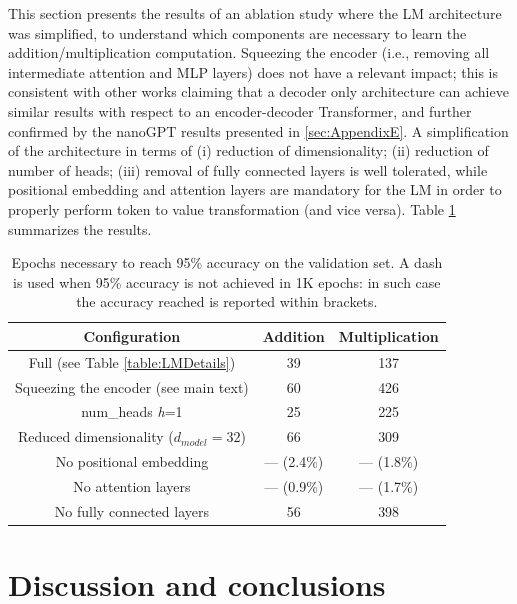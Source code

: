 \documentclass[final,1p,times,authoryear]{elsarticle}
\begin{document}
This section presents the results of an ablation study where the LM architecture was simplified, to understand which components are necessary to learn the addition/multiplication computation. Squeezing the encoder (i.e., removing all intermediate attention and MLP layers) does not have a relevant impact; this is consistent with other works claiming that a decoder only architecture \citep{Liu2018} can achieve similar results with respect to an encoder-decoder Transformer, and further confirmed by the nanoGPT results presented in \ref{sec:AppendixE}. A simplification of the architecture in terms of (i) reduction of dimensionality; (ii) reduction of number of heads; (iii) removal of fully connected layers is well tolerated, while positional embedding and attention layers are mandatory for the LM in order to properly perform token to value transformation (and vice versa).
Table \ref{table:AblationStudy} summarizes the results.
\begin{table}[h]
\caption{Epochs necessary to reach 95\% accuracy on the validation set. A dash is used when 95\% accuracy is not achieved in 1K epochs: in such case the accuracy reached is reported within brackets.}
\label{table:AblationStudy}
\begin{center}
\begin{tabular}{ |c|c|c| } 
 \hline
 \textbf{Configuration} & \textbf{Addition} & \textbf{Multiplication} \\
 \hline
 Full (see Table \ref{table:LMDetails}) & 39 & 137 \\ 
 \hline
 Squeezing the encoder (see main text) & 60 & 426 \\
\hline
 num\_heads \textit{h}=1 & 25 & 225 \\
 \hline
 Reduced dimensionality ($d_{model}=32$) & 66 & 309 \\
 \hline
 No positional embedding & --- (2.4\%) & --- (1.8\%) \\
 \hline
 No attention layers & --- (0.9\%) & --- (1.7\%) \\
 \hline
 No fully connected layers & 56 & 398 \\
 \hline
\end{tabular}
\end{center}
\end{table}

\section{Discussion and conclusions} \label{sec:Conclusions}
\end{document}
